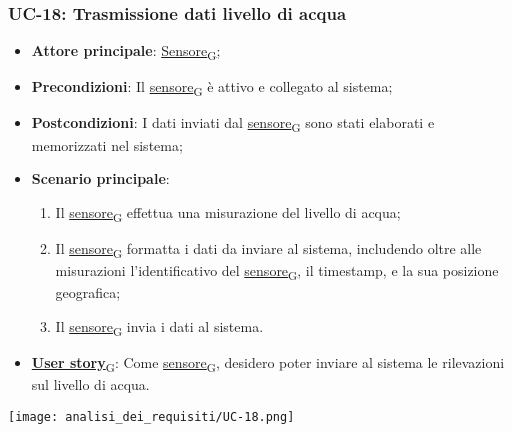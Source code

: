 \subsubsection{UC-18: Trasmissione dati livello di acqua}
\begin{itemize}
	\item \textbf{Attore principale}: \href{https://7last.github.io/docs/rtb/documentazione-interna/glossario\#sensore}{Sensore\textsubscript{G}};
	\item \textbf{Precondizioni}: Il \href{https://7last.github.io/docs/rtb/documentazione-interna/glossario\#sensore}{sensore\textsubscript{G}} è attivo e collegato al sistema;
	\item \textbf{Postcondizioni}: I dati inviati dal \href{https://7last.github.io/docs/rtb/documentazione-interna/glossario\#sensore}{sensore\textsubscript{G}} sono stati elaborati e memorizzati nel sistema;
	\item \textbf{Scenario principale}:
	      \begin{enumerate}
		      \item Il \href{https://7last.github.io/docs/rtb/documentazione-interna/glossario\#sensore}{sensore\textsubscript{G}} effettua una misurazione del livello di acqua;
		      \item Il \href{https://7last.github.io/docs/rtb/documentazione-interna/glossario\#sensore}{sensore\textsubscript{G}} formatta i dati da inviare al sistema, includendo oltre alle misurazioni l'identificativo del \href{https://7last.github.io/docs/rtb/documentazione-interna/glossario\#sensore}{sensore\textsubscript{G}},
		            il timestamp, e la sua posizione geografica;
		      \item Il \href{https://7last.github.io/docs/rtb/documentazione-interna/glossario\#sensore}{sensore\textsubscript{G}} invia i dati al sistema.
	      \end{enumerate}
	\item \href{https://7last.github.io/docs/rtb/documentazione-interna/glossario\#user-story}{\textbf{User story}\textsubscript{G}}: Come \href{https://7last.github.io/docs/rtb/documentazione-interna/glossario\#sensore}{sensore\textsubscript{G}}, desidero poter inviare al sistema le rilevazioni sul livello di acqua.
\end{itemize}

\begin{center}
	\texttt{[image: analisi\_dei\_requisiti/UC-18.png]}
\end{center}



